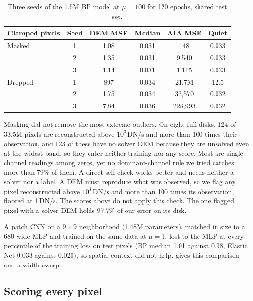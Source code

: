 \begin{table}[t]
\centering
\small
\caption{Three seeds of the 1.5M BP model at $\mu=100$ for 120 epochs, shared test set.}
\label{tab:seeds}
\setlength{\tabcolsep}{3.4pt}
\begin{tabular}{@{}lccccc@{}}
\toprule
Clamped pixels & Seed & DEM MSE & Median & AIA MSE & Quiet\\
\midrule
Masked & 1 & 1.08 & 0.031 & 148 & 0.033\\
 & 2 & 1.35 & 0.031 & 9,540 & 0.033\\
 & 3 & 1.14 & 0.031 & 1,115 & 0.033\\
\midrule
Dropped & 1 & 897 & 0.034 & 21.7M & 12.5\\
 & 2 & 1.75 & 0.034 & 33,570 & 0.032\\
 & 3 & 7.84 & 0.036 & 228,993 & 0.032\\
\bottomrule
\end{tabular}
\end{table}

Masking did not remove the most extreme outliers. On eight full disks, 124 of 33.5M pixels are reconstructed above $10^3$\,DN/s and more than 100 times their observation, and 123 of these have no solver DEM because they are unsolved even at the widest band, so they enter neither training nor any score. Most are single-channel readings among zeros, yet no dominant-channel rule we tried catches more than 79\% of them. A direct self-check works better and needs neither a solver nor a label. A DEM must reproduce what was observed, so we flag any pixel reconstructed above $10^3$\,DN/s and more than 100 times its observation, floored at 1\,DN/s. The scores above do not apply this check. The one flagged pixel with a solver DEM holds 97.7\% of our error on its disk.

A patch CNN on a $9\times9$ neighborhood (1.48M parameters), matched in size to a 680-wide MLP and trained on the same data at $\mu=1$, lost to the MLP at every percentile of the training loss on test pixels (BP median 1.01 against 0.98, Elastic Net 0.033 against 0.020), so spatial context did not help.  gives this comparison and a width sweep.

\subsection{Scoring every pixel}
\label{sec:allpixels}

